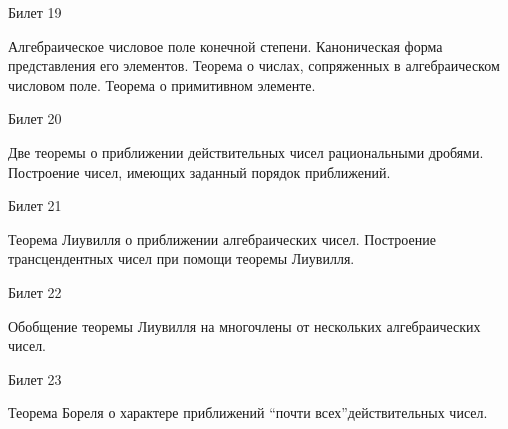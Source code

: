 \documentclass[a4paper,12pt]{article}
\begin{document}
\newpage
\begin{mybox}{\hypertarget{bil19}{Билет 19}}

\begin{formbox}{}
Алгебраическое числовое поле конечной степени. Каноническая форма представления его элементов. Теорема о числах, сопряженных в алгебраическом числовом поле. Теорема о примитивном элементе.
\end{formbox}

\end{mybox}




\newpage
\begin{mybox2}{\hypertarget{bil20}{Билет 20}}

\begin{formbox}{}
Две теоремы о приближении действительных чисел рациональными дробями. Построение чисел, имеющих заданный порядок приближений.
\end{formbox}

\end{mybox2}

\newpage
\begin{mybox}{\hypertarget{bil21}{Билет 21}}

\begin{formbox}{}
Теорема Лиувилля о приближении алгебраических чисел. Построение трансцендентных чисел при помощи теоремы Лиувилля.
\end{formbox}

\end{mybox}

\newpage
\begin{mybox2}{\hypertarget{bil22}{Билет 22}}

\begin{formbox}{}
Обобщение теоремы Лиувилля на многочлены от нескольких алгебраических чисел.
\end{formbox}

\end{mybox2}

\newpage
\begin{mybox}{\hypertarget{bil23}{Билет 23}}

\begin{formbox}{}
Теорема Бореля о характере приближений \textquotedblleft  почти всех\textquotedblright  действительных чисел.
\end{formbox}

\end{mybox}
\end{document}
